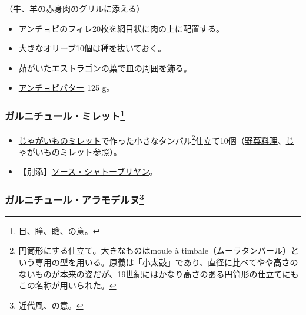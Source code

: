 \begin{recette}


（牛、羊の赤身肉のグリルに添える）

\begin{itemize}
\item
  アンチョビのフィレ20枚を網目状に肉の上に配置する。
\item
  大きなオリーブ10個は種を抜いておく。
\item
  茹がいたエストラゴンの葉で皿の周囲を飾る。
\item
  \protect\hyperlink{beurre-d-anchois}{アンチョビバター} 125 g。
\end{itemize}

\atoaki{}

\hypertarget{garniture-mirette}{%
\subsubsection[ガルニチュール・ミレット]{\texorpdfstring{ガルニチュール・ミレット\footnote{目、瞳、瞼、の意。}}{ガルニチュール・ミレット}}\label{garniture-mirette}}



\begin{itemize}
\item
  \protect\hyperlink{pommes-de-terre-mirette}{じゃがいものミレット}で作った小さなタンバル\footnote{円筒形にする仕立て。大きなものはmoule
    à
    timbale（ムーラタンバール）という専用の型を用いる。原義は「小太鼓」であり、直径に比べてやや高さのないものが本来の姿だが、19世紀にはかなり高さのある円筒形の仕立てにもこの名称が用いられた。}仕立て10個（\protect\hyperlink{legumes}{野菜料理}、\protect\hyperlink{pommes-de-terre-mirette}{じゃがいものミレット}参照）。
\item
  【別添】\protect\hyperlink{sauce-chateaubriand}{ソース・シャトーブリヤン}。
\end{itemize}

\atoaki{}

\hypertarget{garniture-a-la-moderne}{%
\subsubsection[ガルニチュール・アラモデルヌ]{\texorpdfstring{ガルニチュール・アラモデルヌ\footnote{近代風、の意。}}{ガルニチュール・アラモデルヌ}}\label{garniture-a-la-moderne}}


\end{recette}
